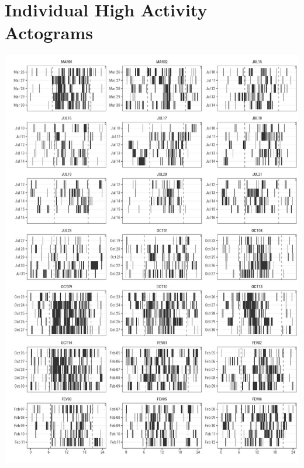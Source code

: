 \documentclass[english,msc,numbers,hidelinks]{coppe}
\begin{document}
  \hypertarget{individual-high-activity-actograms}{%
  \chapter{Individual High Activity Actograms}\label{individual-high-activity-actograms}}
  \begin{center}\includegraphics[width=0.95\linewidth]{../04_figures/actograms/actograms_high} \end{center}
\end{document}
